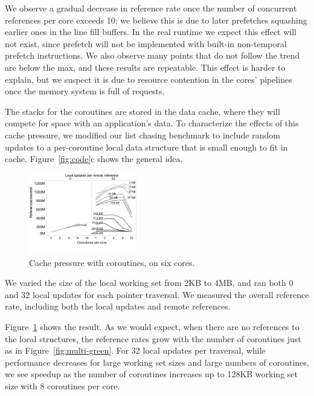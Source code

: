 \documentclass[10pt,nocopyrightspace,preprint]{sigplanconf}
\begin{document}
We observe a gradual decrease in reference rate once the number of
concurrent references per core exceeds 10; we believe this is due to
later prefetches squashing earlier ones in the line fill buffers. In the real runtime we expect this effect will not exist, since prefetch will not be implemented with built-in non-temporal prefetch instructions. We
also observe many points that do not follow the trend are below the max, and these results are repeatable. This effect is harder to explain, but we suspect it is
due to resource contention in the cores' pipelines once the memory
system is full of requests. 



The stacks for the coroutines are stored in the data cache, where they
will compete for space with an application's data. To characterize the
effects of this cache pressure, we modified our list chasing benchmark
to include random updates to a per-coroutine local data structure that
is small enough to fit in cache. Figure~\ref{fig:code}c shows the
general idea.

\begin{figure}[h]
  \begin{center}
    \includegraphics[width=0.42\textwidth]{figures/cache-pressure-edited.pdf}
  \end{center}
  \vspace{-0.3in}
  \caption{Cache pressure with coroutines, on six cores.}
  \label{fig:cache-pressure}
\end{figure}

We varied the size of the local working set from 2KB
to 4MB, and ran both 0 and 32 local updates for each pointer
traversal. We measured the overall reference rate, including both the local updates and remote references.

Figure~\ref{fig:cache-pressure} shows the result. As we would expect,
when there are no references to the local structures, the reference rates grow with the number of coroutines just as in
Figure~\ref{fig:multi-green}. For 32 local updates per traversal, while performance
decreases for large working set sizes and large numbers of coroutines,
we see speedup as the number of coroutines increases up to 128KB working set size with 8 coroutines per
core. 
\end{document}
